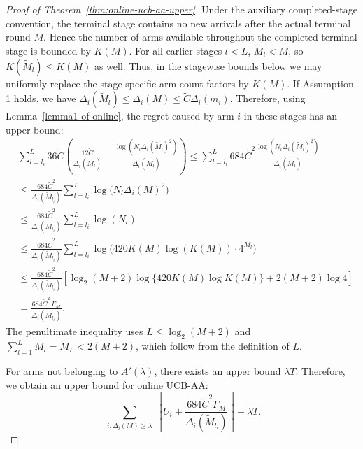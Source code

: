 \documentclass[
  12pt]{article}
\begin{document}
\begin{proof}[Proof of Theorem~\ref{thm:online-ucb-aa-upper}]
Under the auxiliary completed-stage convention, the terminal stage contains no
new arrivals after the actual terminal round \(M\). Hence the number of arms
available throughout the completed terminal stage is bounded by \(K(M)\). For
all earlier stages \(l<L\), \(\tilde M_l<M\), so \(K(\tilde M_l)\le K(M)\) as
well. Thus, in the stagewise bounds below we may uniformly replace the
stage-specific arm-count factors by \(K(M)\).
If Assumption 1 holds, we have $\Delta_i(\tilde{M}_l)\leq \Delta_i(M)\leq \tilde{C}\Delta_i(m_i)$. Therefore, using Lemma~\ref{lemma1 of online}, the regret caused by arm $i$ in these stages has an upper bound:
\begin{align*}
  &\sum_{l=l_i}^{L} 36\tilde{C}
  \left(\frac{12\tilde{C}}{\Delta_i(\tilde{M}_l)}
  +\frac{\log(N_l \Delta_i(\tilde{M}_l)^2)}{\Delta_i(\tilde{M}_l)}\right)
  \le \sum_{l=l_i}^{L} 684\tilde{C}^2
  \frac{\log(N_l \Delta_i(\tilde{M}_l)^2)}{\Delta_i(\tilde{M}_l)} \\
  &\le \frac{684\tilde{C}^2}{\Delta_i(\tilde{M}_{l_i})}
  \sum_{l=l_i}^{L}\log\bigl(N_l \Delta_i(M)^2\bigr) \\
  &\le \frac{684\tilde{C}^2}{\Delta_i(\tilde{M}_{l_i})}
  \sum_{l=l_i}^{L}\log(N_l)\\
  &\le \frac{684\tilde{C}^2}{\Delta_i(\tilde{M}_{l_i})}
  \sum_{l=l_i}^{L}
  \log\bigl(420K(M)\log(K(M))\cdot 4^{M_l}\bigr)\\
  &\le
  \frac{684\tilde{C}^2}{\Delta_i(\tilde{M}_{l_i})}
  \left[
  \log_2(M+2)\log\{420K(M)\log K(M)\}
  +2(M+2)\log 4
  \right]\\
  &=
  \frac{684\tilde{C}^2\,\Gamma_M}{\Delta_i(\tilde{M}_{l_i})}.
\end{align*}
The penultimate inequality uses
$L\le \log_2(M+2)$ and
$\sum_{l=1}^{L}M_l=\tilde M_L<2(M+2)$, which follow from the definition of
$L$.


For arms not belonging to $A'(\lambda)$, there exists an upper bound $\lambda T$. Therefore, we obtain an upper bound for online UCB-AA:
\begin{equation}
\label{eq:onlinebound1}
\sum_{\substack{i: \Delta_i(M) \geq \lambda}}
\left[
U_i
+\frac{684\tilde{C}^2\Gamma_M}{\Delta_i(\tilde{M}_{l_i})}
\right]+\lambda T.
\end{equation}  


\end{proof}
\end{document}
